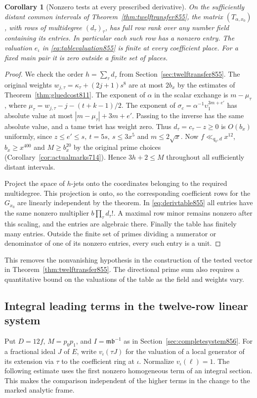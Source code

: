 \documentclass[a4paper,11pt]{article}
\newtheorem{corollary}[proposition]{Corollary}
\theoremstyle{definition}
\theoremstyle{remark}
\numberwithin{equation}{section}
\begin{document}
\begin{corollary}[Nonzero tests at every prescribed derivative]
\leavevmode\label{cor:nonzerotable856}
On the sufficiently distant common intervals of
Theorem~\ref{thm:twelftransfer855}, the matrix
\((T_{\alpha,x_0})\), with rows of multidegree \((d_\tau)_\tau\),
has full row rank over any number field containing its entries.
In particular each such row has a nonzero entry. The valuation
\(e_\iota\) in \eqref{eq:tablevaluation855} is finite at every
coefficient place. For a fixed main pair it is zero outside
a finite set of places.
\end{corollary}
\begin{proof}
We check the order \(h=\sum_\tau d_\tau\) from
Section~\ref{sec:twelftransfer855}. The original weights
\(w_{j,\tau}=\kappa_\tau+(2j+1)s^8\) are at most \(2b_x\)
by the estimates of Theorem~\ref{thm:gluedcost811}. The
exponent of \(\alpha\) in the scalar exchange is
\(m-\mu_\tau\), where
\(\mu_\tau=w_{j,\tau}-j-(t+k-1)/2\). The exponent of
\(\sigma_c=\alpha^{-1}\upsilon_1^{3m+e'}\) has absolute
value at most \(|m-\mu_\tau|+3m+e'\). Passing to the inverse
has the same absolute value, and a tame twist has weight
zero. Thus \(d_\tau=c_\tau-z\ge0\) is \(O(b_x)\) uniformly,
since \(z\le e'\le s,\ t=5s,\ s\le3x^5\) and \(m\le2\sqrt x\).
Now \(f\ll_{q_0,d}x^{12}\), \(b_x\ge x^{400}\) and
\(M\ge b_x^{20}\) by the original prime choices
(Corollary~\ref{cor:actualmarks714}). Hence \(3h+2\le M\)
throughout all sufficiently distant intervals.

Project the space of \(h\)-jets onto the coordinates belonging
to the required multidegree. This projection is onto, so the
corresponding coefficient rows for the \(G_{x_0}\) are
linearly independent by the theorem. In \eqref{eq:derivtable855}
all entries have the same nonzero multiplier
\(b\prod_\tau d_\tau!\). A maximal row minor remains nonzero
after this scaling, and the entries are algebraic there.
Finally the table has finitely many entries. Outside the
finite set of primes dividing a numerator or denominator of
one of its nonzero entries, every such entry is a unit.
\end{proof}

This removes the nonvanishing hypothesis in the construction
of the tested vector in Theorem~\ref{thm:twelftransfer855}.
The directional prime sum also requires a quantitative bound
on the valuations of the table as the field and weights vary.
\clearpage

\subsection{Integral leading terms in the twelve-row linear system}
\label{sec:integralleading857}
Put \(D=12f\), \(M=p_0p_1\), and \(I=\mathfrak m\mathfrak b^{-1}\)
as in Section~\ref{sec:completesystem856}. For a fractional ideal
\(J\) of \(E\), write \(v_\iota(\tau J)\) for the valuation of a
local generator of its extension via \(\tau\) to the coefficient
ring at \(\iota\). Normalize \(v_\iota(\ell)=1\).
The following estimate uses the first nonzero homogeneous term
of an integral section. This makes the comparison independent
of the higher terms in the change to the marked analytic frame.
\end{document}
